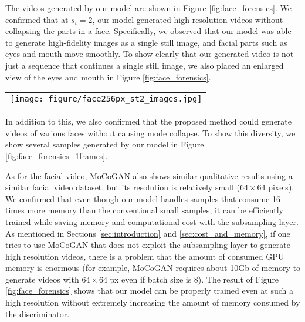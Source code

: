 \documentclass[twocolumn]{svjour3}
\def\Fig#1{Figure \ref{fig:#1}}
\begin{document}
The videos generated by our model are shown in \Fig{face_forensics}.
We confirmed that at $s_t=2$, our model generated high-resolution videos without collapsing the parts in a face.
Specifically, we observed that our model was able to generate high-fidelity images as a single still image, and facial parts such as eyes and mouth move smoothly.
To show clearly that our generated video is not just a sequence that continues a single still image, we also placed an enlarged view of the eyes and mouth in \Fig{face_forensics}.

\begin{figure*}
\begin{tabular}{c}
    \!\!\!\!\texttt{[image: figure/face256px\_st2\_images.jpg]} \\
\end{tabular}
\caption{
A list of still images extracted from videos generated by our model ($s_t=2$).
The FaceForensics dataset was used for the training.
}
\label{fig:face_forensics_1frames}

\end{figure*}




In addition to this, we also confirmed that the proposed method could generate
videos of various faces without causing mode collapse.
To show this diversity, we show several samples generated by our model in \Fig{face_forensics_1frames}.














As for the facial video, MoCoGAN also shows similar qualitative results using a similar facial video dataset, but its resolution is relatively small ($64 \times 64$ pixels).
We confirmed that even though our model handles samples that consume 16 times more memory than the conventional small samples, it can be efficiently trained while saving memory and computational cost with the subsampling layer.
As mentioned in Sections \ref{sec:introduction} and \ref{sec:cost_and_memory},
if one tries to use MoCoGAN that does not exploit the subsampling layer to generate
high resolution videos, there is a problem that the amount of consumed GPU memory is enormous (for example, MoCoGAN requires about 10Gb of memory to generate videos with $64 \times 64$ px even if batch size is 8).
The result of \Fig{face_forensics} shows that our model can be properly trained even at such a high resolution without extremely increasing the amount of memory consumed by the discriminator.
\end{document}
